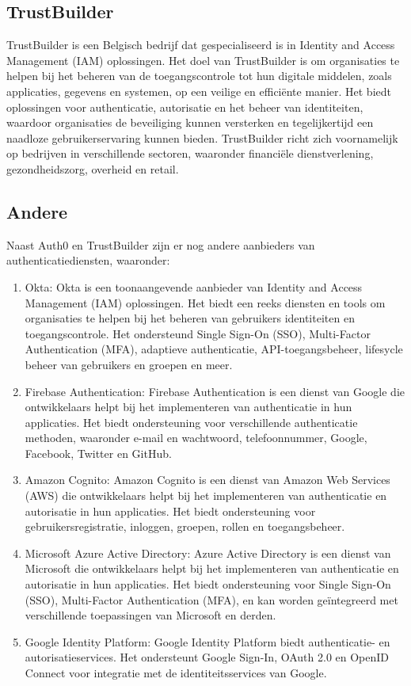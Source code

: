   \subsection{TrustBuilder}%
  \label{subsec:trustbuilder}
  TrustBuilder is een Belgisch bedrijf dat gespecialiseerd is in Identity and Access Management (IAM) oplossingen. Het doel van TrustBuilder is om organisaties te helpen bij het beheren van de toegangscontrole tot hun digitale middelen, zoals applicaties, gegevens en systemen, op een veilige en efficiënte manier. Het biedt oplossingen voor authenticatie, autorisatie en het beheer van identiteiten, waardoor organisaties de beveiliging kunnen versterken en tegelijkertijd een naadloze gebruikerservaring kunnen bieden. TrustBuilder richt zich voornamelijk op bedrijven in verschillende sectoren, waaronder financiële dienstverlening, gezondheidszorg, overheid en retail.
  
  
  \subsection{Andere}%
  \label{subsec:andere}
  Naast Auth0 en TrustBuilder zijn er nog andere aanbieders van authenticatiediensten, waaronder:
  \begin{enumerate}[label=\textbf{-}]
    \item Okta: Okta is een toonaangevende aanbieder van Identity and Access Management (IAM) oplossingen. Het biedt een reeks diensten en tools om organisaties te helpen bij het beheren van gebruikers identiteiten en toegangscontrole. Het ondersteund Single Sign-On (SSO), Multi-Factor Authentication (MFA), adaptieve authenticatie, API-toegangsbeheer, lifesycle beheer van gebruikers en groepen en meer.
    \item Firebase Authentication: Firebase Authentication is een dienst van Google die ontwikkelaars helpt bij het implementeren van authenticatie in hun applicaties. Het biedt ondersteuning voor verschillende authenticatie methoden, waaronder e-mail en wachtwoord, telefoonnummer, Google, Facebook, Twitter en GitHub.
    \item Amazon Cognito: Amazon Cognito is een dienst van Amazon Web Services (AWS) die ontwikkelaars helpt bij het implementeren van authenticatie en autorisatie in hun applicaties. Het biedt ondersteuning voor gebruikersregistratie, inloggen, groepen, rollen en toegangsbeheer.
    \item Microsoft Azure Active Directory: Azure Active Directory is een dienst van Microsoft die ontwikkelaars helpt bij het implementeren van authenticatie en autorisatie in hun applicaties. Het biedt ondersteuning voor Single Sign-On (SSO), Multi-Factor Authentication (MFA), en kan worden geïntegreerd met verschillende toepassingen van Microsoft en derden.
    \item Google Identity Platform: Google Identity Platform biedt authenticatie- en autorisatieservices. Het ondersteunt Google Sign-In, OAuth 2.0 en OpenID Connect voor integratie met de identiteitsservices van Google.
  \end{enumerate}



